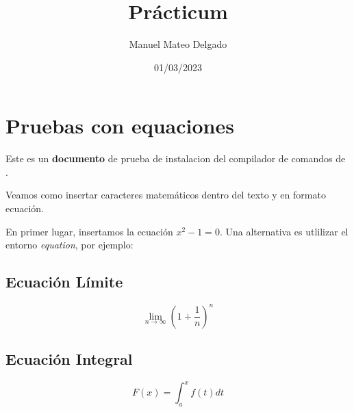 \documentclass[12pt]{article}
\title{\Huge Prácticum \Latex}
\author{\Large Manuel Mateo Delgado}
\date{01/03/2023}
\begin{document}
    \maketitle %


    \clearpage %

    \tableofcontents %

    \clearpage

    \section{Pruebas con equaciones}

        Este es un \textbf{documento} de prueba de instalacion del compilador de comandos de \textit{\Latex}. \smalllskip

        Veamos como insertar caracteres matemáticos dentro del texto y en formato ecuación. \smallskip 

        En primer lugar, insertamos la ecuación $x^2-1=0$. Una alternativa es utlilizar el entorno \textit{equation}, por ejemplo:

        \subsection{Ecuación Límite}
        
            \begin{equation}\label{LimInf}

                \lim_{n\to\infty}\left(1+ \frac{1}{n}\right)^n
            \end{equation}

        \subsection{Ecuación Integral}  

            \begin{equation}\label{TFC} %

                F(x) = \int_a^xf(t)dt %

            \end{equation}
\end{document}
